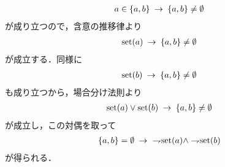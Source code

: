 \begin{sketch}
		\begin{align}
			a \in \{a,b\} \rarrow \{a,b\} \neq \emptyset
		\end{align}
		が成り立つので，含意の推移律より
		\begin{align}
			\set{a} \rarrow \{a,b\} \neq \emptyset
		\end{align}
		が成立する．同様に
		\begin{align}
			\set{b} \rarrow \{a,b\} \neq \emptyset
		\end{align}
		も成り立つから，場合分け法則より
		\begin{align}
			\set{a} \vee \set{b} \rarrow \{a,b\} \neq \emptyset
		\end{align}
		が成立し，この対偶を取って
		\begin{align}
			\{a,b\} = \emptyset \rarrow\ \negation \set{a} \wedge \negation \set{b}
		\end{align}
		が得られる．
		\QED
	\end{sketch}
	